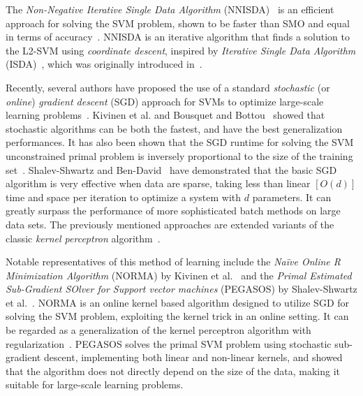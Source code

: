 \documentclass[reqno]{vcuthesis}
\numberwithin{equation}{chapter}
\begin{document}
The \textit{Non-Negative Iterative Single Data Algorithm} (NNISDA)~\cite{zigic2016} is an efficient approach for solving the SVM problem, shown to be faster than SMO and equal in terms of accuracy~\cite{Kecman2014}. NNISDA is an iterative algorithm that finds a solution to the L2-SVM using \textit{coordinate descent}, inspired by \textit{Iterative Single Data Algorithm} (ISDA)~\cite{Huang2006}, which was originally introduced in~\cite{Kecman2005}.

Recently, several authors have proposed the use of a standard \textit{stochastic} (or \textit{online}) \textit{gradient descent} (SGD) approach for SVMs to optimize large-scale learning problems~\cite{herbrich2016learning,kivinen2002large,Schoelkopf2002,Shalev2014,shalev2011pegasos}. Kivinen et al.\cite{kivinen2004online} and Bousquet and Bottou~\cite{bousquet2008tradeoffs} showed that stochastic algorithms can be both the fastest, and have the best generalization performances. It has also been shown that the SGD runtime for solving the SVM unconstrained primal problem is inversely proportional to the size of the training set~\cite{panagiotakopoulos2013stochastic,shalev2008svm}. Shalev-Shwartz and Ben-David~\cite{Shalev2014} have demonstrated that the basic SGD algorithm is very effective when data are sparse, taking less than linear $[O(d)]$ time and space per iteration to optimize a system with $d$ parameters. It can greatly surpass the performance of more sophisticated batch methods on large data sets. The previously mentioned approaches are extended variants of the classic \textit{kernel perceptron} algorithm~\cite{collobert2004links}. 

Notable representatives of this method of learning include the \textit{Na{\"i}ve Online R Minimization Algorithm} (NORMA) by Kivinen et al.~\cite{kivinen2004online} and the \textit{Primal Estimated Sub-Gradient SOlver for Support vector machines} (PEGASOS) by Shalev-Shwartz et al.~\cite{shalev2011pegasos}. NORMA is an online kernel based algorithm designed to utilize SGD for solving the SVM problem, exploiting the kernel trick in an online setting. It can be regarded as a generalization of the kernel perceptron algorithm with regularization~\cite{kivinen2004online}. PEGASOS solves the primal SVM problem using stochastic sub-gradient descent, implementing both linear and non-linear kernels, and showed that the algorithm does not directly depend on the size of the data, making it suitable for large-scale learning problems. 
\end{document}
